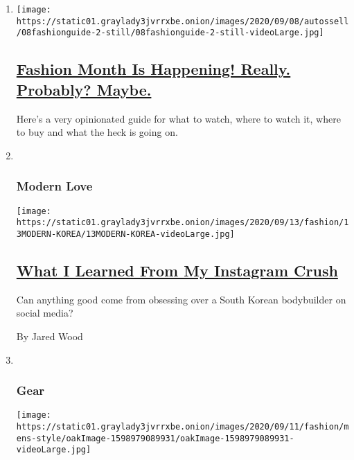 \begin{enumerate}
\def\labelenumi{\arabic{enumi}.}
\item
  \texttt{[image: https://static01.graylady3jvrrxbe.onion/images/2020/09/08/autossell/08fashionguide-2-still/08fashionguide-2-still-videoLarge.jpg]}

  \hypertarget{fashion-month-is-happening-really-probably-maybe}{%
  \subsection{\texorpdfstring{\href{/2020/09/08/style/fashion-month-schedule.html}{Fashion
  Month Is Happening! Really. Probably?
  Maybe.}}{Fashion Month Is Happening! Really. Probably? Maybe.}}\label{fashion-month-is-happening-really-probably-maybe}}

  Here's a very opinionated guide for what to watch, where to watch it,
  where to buy and what the heck is going on.
\item ~
  \hypertarget{modern-love}{%
  \subsubsection{Modern Love}\label{modern-love}}

  \texttt{[image: https://static01.graylady3jvrrxbe.onion/images/2020/09/13/fashion/13MODERN-KOREA/13MODERN-KOREA-videoLarge.jpg]}

  \hypertarget{what-i-learned-from-my-instagram-crush}{%
  \subsection{\texorpdfstring{\href{/2020/09/11/style/modern-love-no-emoticon-for-this-emotion.html}{What
  I Learned From My Instagram
  Crush}}{What I Learned From My Instagram Crush}}\label{what-i-learned-from-my-instagram-crush}}

  Can anything good come from obsessing over a South Korean bodybuilder
  on social media?

  By Jared Wood
\item ~
  \hypertarget{gear}{%
  \subsubsection{Gear}\label{gear}}

  \texttt{[image: https://static01.graylady3jvrrxbe.onion/images/2020/09/11/fashion/mens-style/oakImage-1598979089931/oakImage-1598979089931-videoLarge.jpg]}


\end{enumerate}
